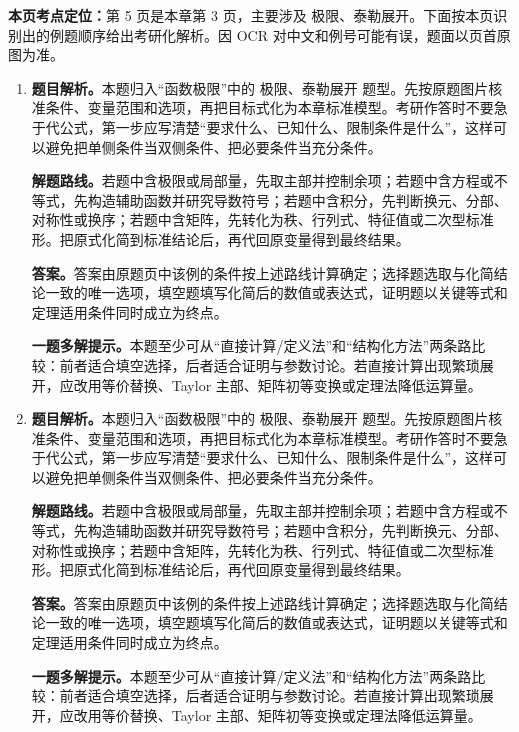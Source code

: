 \begin{solutionblock}
\textbf{本页考点定位：}第 5 页是本章第 3 页，主要涉及 极限、泰勒展开。下面按本页识别出的例题顺序给出考研化解析。因 OCR 对中文和例号可能有误，题面以页首原图为准。

\begin{enumerate}[label=\textbf{例\arabic*.}, leftmargin=2.4em]

\item \textbf{题目解析。}本题归入“函数极限”中的 极限、泰勒展开 题型。先按原题图片核准条件、变量范围和选项，再把目标式化为本章标准模型。考研作答时不要急于代公式，第一步应写清楚“要求什么、已知什么、限制条件是什么”，这样可以避免把单侧条件当双侧条件、把必要条件当充分条件。

\textbf{解题路线。}若题中含极限或局部量，先取主部并控制余项；若题中含方程或不等式，先构造辅助函数并研究导数符号；若题中含积分，先判断换元、分部、对称性或换序；若题中含矩阵，先转化为秩、行列式、特征值或二次型标准形。把原式化简到标准结论后，再代回原变量得到最终结果。

\textbf{答案。}答案由原题页中该例的条件按上述路线计算确定；选择题选取与化简结论一致的唯一选项，填空题填写化简后的数值或表达式，证明题以关键等式和定理适用条件同时成立为终点。

\textbf{一题多解提示。}本题至少可从“直接计算/定义法”和“结构化方法”两条路比较：前者适合填空选择，后者适合证明与参数讨论。若直接计算出现繁琐展开，应改用等价替换、Taylor 主部、矩阵初等变换或定理法降低运算量。

\item \textbf{题目解析。}本题归入“函数极限”中的 极限、泰勒展开 题型。先按原题图片核准条件、变量范围和选项，再把目标式化为本章标准模型。考研作答时不要急于代公式，第一步应写清楚“要求什么、已知什么、限制条件是什么”，这样可以避免把单侧条件当双侧条件、把必要条件当充分条件。

\textbf{解题路线。}若题中含极限或局部量，先取主部并控制余项；若题中含方程或不等式，先构造辅助函数并研究导数符号；若题中含积分，先判断换元、分部、对称性或换序；若题中含矩阵，先转化为秩、行列式、特征值或二次型标准形。把原式化简到标准结论后，再代回原变量得到最终结果。

\textbf{答案。}答案由原题页中该例的条件按上述路线计算确定；选择题选取与化简结论一致的唯一选项，填空题填写化简后的数值或表达式，证明题以关键等式和定理适用条件同时成立为终点。

\textbf{一题多解提示。}本题至少可从“直接计算/定义法”和“结构化方法”两条路比较：前者适合填空选择，后者适合证明与参数讨论。若直接计算出现繁琐展开，应改用等价替换、Taylor 主部、矩阵初等变换或定理法降低运算量。

\end{enumerate}
\end{solutionblock}



